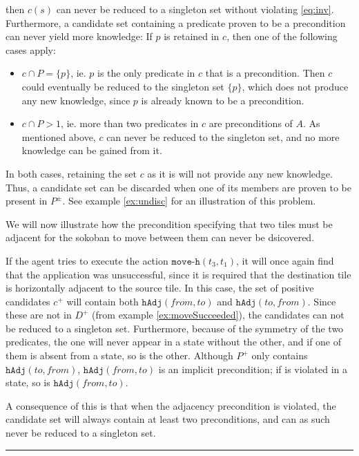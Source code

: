 \documentclass[../../Master.tex]{subfiles}
\begin{document}
then $c(s)$ can never be reduced to a singleton set without violating \eqref{eq:inv}. Furthermore, a candidate set containing a predicate proven to be a precondition can never yield more knowledge: If $p$ is retained in $c$, then one of the following cases apply:
\begin{itemize}
    \item $c \cap P = \{ p \}$, ie. $p$ is the only predicate in $c$ that is a precondition. Then $c$ could eventually be reduced to the singleton set $\{ p \}$, which does not produce any new knowledge, since $p$ is already known to be a precondition.

    \item $c \cap P > 1$, ie. more than two predicates in $c$ are preconditions of $A$. As mentioned above, $c$ can never be reduced to the singleton set, and no more knowledge can be gained from it.
\end{itemize}
In both cases, retaining the set $c$ as it is will not provide any new knowledge. Thus, a candidate set can be discarded when one of its members are proven to be present in $P^{\pm}$. See example \ref{ex:undisc} for an illustration of this problem.

\begin{example} \label{ex:undisc}
    We will now illustrate how the precondition specifying that two tiles must be adjacent for the sokoban to move between them can never be dsicovered.

    If the agent tries to execute the action $\texttt{move-h}(t_3, t_1)$, it will once again find that the application was unsuccessful, since it is required that the destination tile is horizontally adjacent to the source tile. In this case, the set of positive candidates $c^+$ will contain both $\texttt{hAdj}(from, to)$ and $\texttt{hAdj}(to, from)$. Since these are not in $D^+$ (from example \ref{ex:moveSucceeded}), the candidates can not be reduced to a singleton set. Furthermore, because of the symmetry of the two predicates, the one will never appear in a state without the other, and if one of them is absent from a state, so is the other. Although $P^+$ only contains $\texttt{hAdj}(to, from)$, $\texttt{hAdj}(from, to)$ is an implicit precondition; if is violated in a state, so is $\texttt{hAdj}(from, to)$.

    A consequence of this is that when the adjacency precondition is violated, the candidate set will always contain at least two preconditions, and can as such never be reduced to a singleton set.

    \noindent\rule{\textwidth}{1pt}
\end{example}
\end{document}
